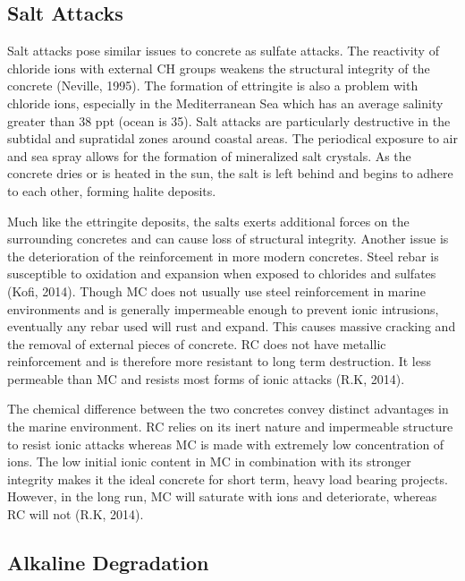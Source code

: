 \documentclass[12pt]{article}
\begin{document}

\subsection*{Salt Attacks}
    
Salt attacks pose similar issues to concrete as sulfate attacks. The reactivity of chloride ions with external CH groups weakens the structural integrity of the concrete (Neville, 1995). The formation of ettringite is also a problem with chloride ions, especially in the Mediterranean Sea which has an average salinity greater than 38 ppt (ocean is 35). Salt attacks are particularly destructive in the subtidal and supratidal zones around coastal areas. The periodical exposure to air and sea spray allows for the formation of mineralized salt crystals. As the concrete dries or is heated in the sun, the salt is left behind and begins to adhere to each other, forming halite deposits.


Much like the ettringite deposits, the salts exerts additional forces on the surrounding concretes and can cause loss of structural integrity. Another issue is the deterioration of the reinforcement in more modern concretes. Steel rebar is susceptible to oxidation and expansion when exposed to chlorides and sulfates (Kofi, 2014). Though MC does not usually use steel reinforcement in marine environments and is generally impermeable enough to prevent ionic intrusions, eventually any rebar used will rust and expand. This causes massive cracking and the removal of external pieces of concrete. RC does not have metallic reinforcement and is therefore more resistant to long term destruction. It less permeable than MC and resists most forms of ionic attacks (R.K, 2014).


The chemical difference between the two concretes convey distinct advantages in the marine environment. RC relies on its inert nature and impermeable structure to resist ionic attacks whereas MC is made with extremely low concentration of ions. The low initial ionic content in MC in combination with its stronger integrity makes it the ideal concrete for short term, heavy load bearing projects. However, in the long run, MC will saturate with ions and deteriorate, whereas RC will not (R.K, 2014).

\subsection*{Alkaline Degradation}
\end{document}
